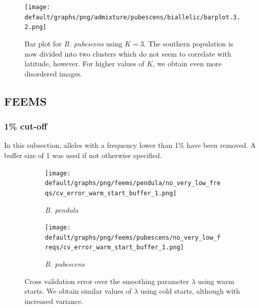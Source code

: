 \documentclass[hidelinks,11pt]{article}
\newcommand{\pendula}{\textit{B. pendula}}
\newcommand{\pubescens}{\textit{B. pubescens}}
\begin{document}
    \begin{figure}[H]
        \centering
        \texttt{[image: default/graphs/png/admixture/pubescens/biallelic/barplot.3.2.png]}
        \caption{Bar plot for \pubescens{} using $K=3$. The southern population is now divided into two clusters which do not seem to correlate with latitude, however. For higher values of $K$, we obtain even more disordered images.}
        \label{fig:admixture_barplot_pubescens_3}
    \end{figure}

    \clearpage

    \subsection{FEEMS}
    \label{sec:appendix-feems}

    \subsubsection{1\% cut-off}

    In this subsection, alleles with a frequency lower than 1\% have been removed. A buffer size of 1 was used if not otherwise specified.

    \begin{figure}[H]
        \centering
        \begin{subfigure}[b]{0.48\textwidth}
            \centering
            \texttt{[image: default/graphs/png/feems/pendula/no\_very\_low\_freqs/cv\_error\_warm\_start\_buffer\_1.png]}
            \caption{\pendula{}}
        \end{subfigure}
        \hfill
        \begin{subfigure}[b]{0.48\textwidth}
            \centering
            \texttt{[image: default/graphs/png/feems/pubescens/no\_very\_low\_freqs/cv\_error\_warm\_start\_buffer\_1.png]}
            \caption{\pubescens{}}
        \end{subfigure}
        \caption{Cross validation error over the smoothing parameter $\lambda$ using warm starts. We obtain similar values of $\lambda$ using cold starts, although with increased variance.}
        \label{fig:feems_cv_error_no_very_low_freqs}
    \end{figure}
\end{document}
